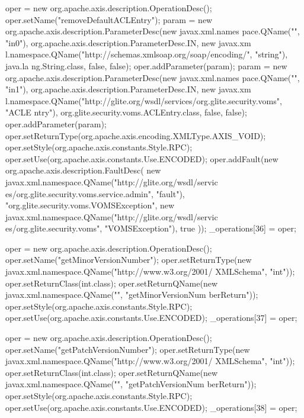 \begin{DoxyCode}
{        oper = new org.apache.axis.description.OperationDesc();
        oper.setName("removeDefaultACLEntry");
        param = new org.apache.axis.description.ParameterDesc(new javax.xml.names
      pace.QName("", "in0"), org.apache.axis.description.ParameterDesc.IN, new javax.xm
      l.namespace.QName("http://schemas.xmlsoap.org/soap/encoding/", "string"), java.la
      ng.String.class, false, false);
        oper.addParameter(param);
        param = new org.apache.axis.description.ParameterDesc(new javax.xml.names
      pace.QName("", "in1"), org.apache.axis.description.ParameterDesc.IN, new javax.xm
      l.namespace.QName("http://glite.org/wsdl/services/org.glite.security.voms", "ACLE
      ntry"), org.glite.security.voms.ACLEntry.class, false, false);
        oper.addParameter(param);
        oper.setReturnType(org.apache.axis.encoding.XMLType.AXIS_VOID);
        oper.setStyle(org.apache.axis.constants.Style.RPC);
        oper.setUse(org.apache.axis.constants.Use.ENCODED);
        oper.addFault(new org.apache.axis.description.FaultDesc(
                      new javax.xml.namespace.QName("http://glite.org/wsdl/servic
      es/org.glite.security.voms.service.admin", "fault"),
                      "org.glite.security.voms.VOMSException",
                      new javax.xml.namespace.QName("http://glite.org/wsdl/servic
      es/org.glite.security.voms", "VOMSException"), 
                      true
                     ));
        _operations[36] = oper;

        oper = new org.apache.axis.description.OperationDesc();
        oper.setName("getMinorVersionNumber");
        oper.setReturnType(new javax.xml.namespace.QName("http://www.w3.org/2001/
      XMLSchema", "int"));
        oper.setReturnClass(int.class);
        oper.setReturnQName(new javax.xml.namespace.QName("", "getMinorVersionNum
      berReturn"));
        oper.setStyle(org.apache.axis.constants.Style.RPC);
        oper.setUse(org.apache.axis.constants.Use.ENCODED);
        _operations[37] = oper;

        oper = new org.apache.axis.description.OperationDesc();
        oper.setName("getPatchVersionNumber");
        oper.setReturnType(new javax.xml.namespace.QName("http://www.w3.org/2001/
      XMLSchema", "int"));
        oper.setReturnClass(int.class);
        oper.setReturnQName(new javax.xml.namespace.QName("", "getPatchVersionNum
      berReturn"));
        oper.setStyle(org.apache.axis.constants.Style.RPC);
        oper.setUse(org.apache.axis.constants.Use.ENCODED);
        _operations[38] = oper;

    }
\end{DoxyCode}
